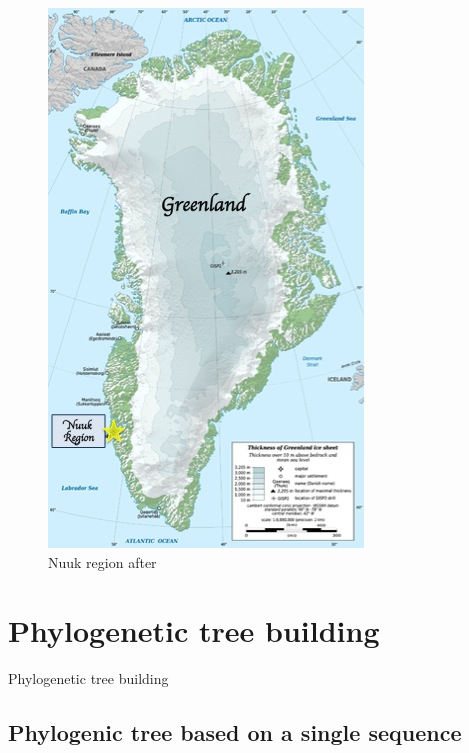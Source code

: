 \documentclass[]{article}
\begin{document}
\begin{figure}[H]
	\caption{Nuuk region after \cite{enwiki:1095301862}}\label{fig:nuuk}
	\includegraphics[width=\textwidth]{Nuuk_Location}
\end{figure}
\section{Phylogenetic tree building}
Phylogenetic tree building \cite{altschul1990basic}

\subsection{Phylogenic tree based on a single sequence}
\end{document}
